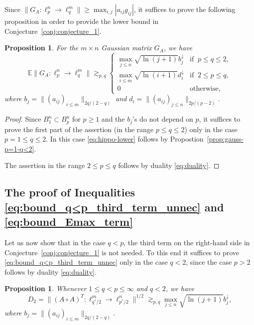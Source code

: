 \documentclass[a4paper]{amsart}
\newtheorem{proposition}[theorem]{Proposition} %
\theoremstyle{definition}
\theoremstyle{remark}
\numberwithin{equation}{section}
\newcommand*{\EE}{\mathbb{E}}
\newcommand*{\hadprod}{\mathbin{\circ}} %
\newcommand*{\rearr}{\downarrow} %
\begin{document}
Since $\|G_A\colon \ell_{p}^n\to\ell_q^m\| \ge \max_{i,j} |a_{ij}g_{ij}|$, it suffices to prove the following proposition in order to provide the lower bound in Conjecture~\ref{conj:conjecture_1}.

\begin{proposition}
	 For the $m\times n$ Gaussian matrix $G_A$, we have
	 \begin{equation} \label{eq:hippo-lower}
\EE \|G_A\colon \ell_{p}^n\to\ell_q^m\|
\gtrsim_{p,q} 
\begin{cases}
  \max_{j\le n}\sqrt{\ln (j+1)} b_j^{\rearr{}}  &    \text{if }\ p\leq q\leq 2,\\
  \max_{i\le m}\sqrt{\ln (i+1)} d_i^{\rearr{}}  &   \text{if } \ 2\leq p \leq q, \\
  0 & \text{otherwise,}
\end{cases} 
\end{equation}
where $b_j= \|(a_{ij})_{i\le m} \|_{2q/(2-q)}$ and $d_i=\| (a_{ij})_{j\le n}\|_{2p/(p-2)}$.
\end{proposition}

\begin{proof}
	Since $B_1^n\subset B_p^n$ for $p\ge 1$ and the $b_j$'s do not depend on $p$, it suffices to prove the first part of the assertion (in the range $p\leq q\leq 2$) only in the case $p=1\leq q\leq 2$. In this case \eqref{eq:hippo-lower} follows by Propostion~\ref{prop:gauss-p=1-q<2}.
	
	The assertion in the range $2\leq p \leq q$ follows by duality \eqref{eq:duality}.
\end{proof}

\subsection{The proof of Inequalities \texorpdfstring{\eqref{eq:bound_q<p_third_term_unnec} and \eqref{eq:bound_Emax_term}}{with D1 + D2}}
\label{sec:The_proof_of_Inequalities_with_D1+D2}

Let us now show that in the case $q<p$, the third term on the right-hand side in Conjecture~\ref{conj:conjecture_1} is not needed.
To this end it suffices to prove \eqref{eq:bound_q<p_third_term_unnec} only in the case $q<2$, since the case $p>2$ follows by duality \eqref{eq:duality}. 

\begin{proposition}	\label{prop:third-term-is-not-needed}
	Whenever $1\leq q<p \leq \infty$ and $q<2$, we have
	\begin{equation}	\label{eq:third-term-is-not-needed}
	D_2=\|(A\hadprod A)^T \colon \ell^m_{q^*/2} \to \ell^n_{p^*/2}\|^{1/2} \gtrsim_{p,q} \max_{j\le n}\sqrt{\ln (j+1)} b_j^{\rearr{}} ,
	\end{equation}
	where $b_j= \|(a_{ij})_{i\le m} \|_{2q/(2-q)}$.
\end{proposition}
\end{document}
